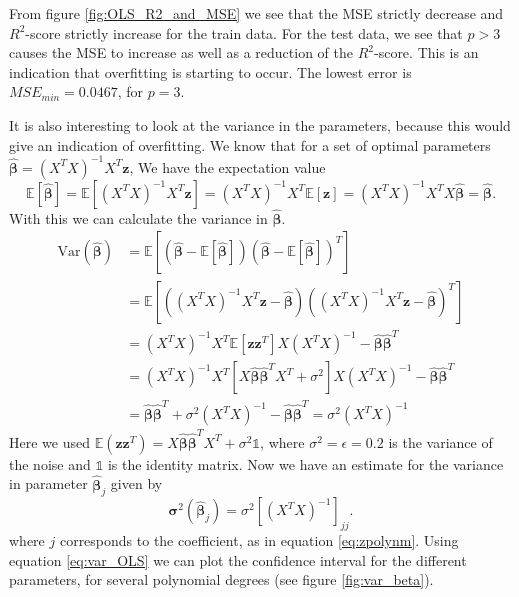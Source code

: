 \documentclass[reprint,english,notitlepage,aps,nobalancelastpage,nofootinbib]{revtex4-1}  %
\newcommand{\vc}[1]{\mathbf{#1}}
\begin{document}
From figure \ref{fig:OLS_R2_and_MSE} we see that the MSE strictly decrease and $R^2$-score strictly increase for the train data. For the test data, we see that $p>3$ causes the MSE to increase as well as a reduction of the $R^2$-score. This is an indication that overfitting is starting to occur. The lowest error is $MSE_{min} = 0.0467$, for $p=3$.

It is also interesting to look at the variance in the parameters, because this would give an indication of overfitting. We know that for a set of optimal parameters
$\boldsymbol{\hat{\beta}} = (X^TX)^{-1}X^T \vc{z}$,
We have the expectation value
\begin{equation*}
	\mathbb{E}[\boldsymbol{\hat{\beta}}] = \mathbb{E}[(X^TX)^{-1}X^T \vc{z}] = (X^TX)^{-1}X^T\mathbb{E}[\vc{z}] = (X^TX)^{-1}X^TX\boldsymbol{\hat{\beta}} = \boldsymbol{\hat{\beta}}.
\end{equation*}
With this we can calculate the variance in $\boldsymbol{\hat{\beta}}$.
\begin{align*}
	\text{Var}(\boldsymbol{\hat{\beta}}) &= \mathbb{E}\left[(\boldsymbol{\hat{\beta}} - \mathbb{E}[\boldsymbol{\hat{\beta}}])(\boldsymbol{\hat{\beta}} - \mathbb{E}[\boldsymbol{\hat{\beta}}])^T\right] \\
	&= \mathbb{E}\left[((X^TX)^{-1}X^T\vc{z}- \boldsymbol{\hat{\beta}})((X^TX)^{-1}X^T\vc{z}- \boldsymbol{\hat{\beta}})^T\right] \\
	&= (X^TX)^{-1}X^T \mathbb{E}\left[\vc{z}\vc{z}^T\right]X(X^TX)^{-1}- \boldsymbol{\hat{\beta}}\boldsymbol{\hat{\beta}}^T \\
	&= (X^TX)^{-1}X^T\left[X\boldsymbol{\hat{\beta}}\boldsymbol{\hat{\beta}}^TX^T + \sigma^2 \right] X (X^TX)^{-1} - \boldsymbol{\hat{\beta}}\boldsymbol{\hat{\beta}}^T \\
	&= \boldsymbol{\hat{\beta}}\boldsymbol{\hat{\beta}}^T + \sigma^2(X^TX)^{-1} - \boldsymbol{\hat{\beta}}\boldsymbol{\hat{\beta}}^T = \sigma^2(X^TX)^{-1}
\end{align*}
Here we used $\mathbb{E} (\vc{z}\vc{z}^T) = X \boldsymbol{\hat{\beta}}\boldsymbol{\hat{\beta}}^T X^T + \sigma^2\mathbb{1}$, where $\sigma^2 = \epsilon = 0.2$ is the variance of the noise and $\mathbb{1}$ is the identity matrix. Now we have an estimate for the variance in parameter $\boldsymbol{\hat{\beta}}_{j}$ given by
\begin{equation}
	\boldsymbol{\sigma}^2(\boldsymbol{\hat{\beta}}_{j}) = \sigma^2 [(X^TX)^{-1}]_{jj}.
	\label{eq:var_OLS}
\end{equation}
where $j$ corresponds to the coefficient, as in equation \eqref{eq:zpolynm}. Using equation \eqref{eq:var_OLS} we can plot the confidence interval for the different parameters, for several polynomial degrees (see figure \ref{fig:var_beta}).
\end{document}
